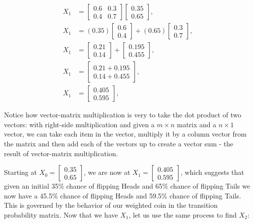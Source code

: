 \documentclass[12pt,final]{article}
\begin{document}
\begin{subequations}
\begin{align}
  X_1 &= \begin{bmatrix}
    0.6 & 0.3 \\
    0.4 & 0.7
  \end{bmatrix}
  \begin{bmatrix}
    0.35 \\
    0.65
  \end{bmatrix}, \\
  X_1 &= (0.35)\begin{bmatrix}
    0.6 \\
    0.4
  \end{bmatrix} +
  (0.65)\begin{bmatrix}
    0.3 \\
    0.7
  \end{bmatrix}, \\
  X_1 &= \begin{bmatrix}
    0.21 \\
    0.14
  \end{bmatrix} +
  \begin{bmatrix}
    0.195 \\
    0.455
  \end{bmatrix}, \\
  X_1 &= \begin{bmatrix}
    0.21 + 0.195 \\
    0.14 + 0.455
  \end{bmatrix}, \\
    X_1 &= \begin{bmatrix}
      0.405 \\
      0.595
  \end{bmatrix},
\end{align}
\label{eq:markovequationweightedcointosssolutionx1}
\end{subequations}

Notice how vector-matrix multiplication is very to take the dot product of two vectors: with
right-side multiplication and given a $m \times n$ matrix and a $n \times 1$ vector, we can take
each item in the vector, multiply it by a column vector from the matrix and then add each of
the vectors up to create a vector sum - the result of vector-matrix multiplication.

Starting at $X_0 = \begin{bmatrix} 0.35 \\ 0.65 \end{bmatrix}$, we are now at
$X_1 = \begin{bmatrix} 0.405 \\ 0.595 \end{bmatrix}$, which suggests that given an initial 35\%
chance of flipping Heads and 65\% chance of flipping Tails we now have a 45.5\% chance of flipping
Heads and 59.5\% chance of flipping Tails. This is governed by the behavior of our weighted coin
in the transition probability matrix. Now that we have $X_1$, let us use the same process to find
$X_2$:
\end{document}
